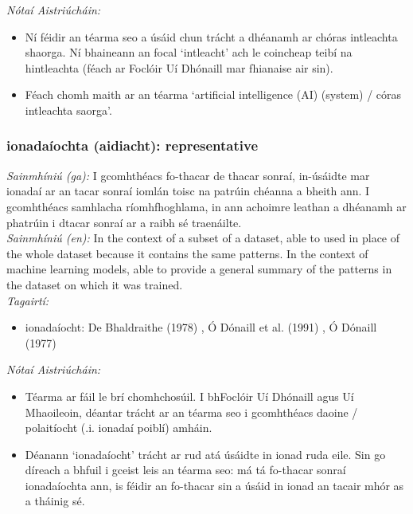  \noindent \textit{Nótaí Aistriúcháin:}
\begin{itemize}
	\item Ní féidir an téarma seo a úsáid chun trácht a dhéanamh ar chóras intleachta shaorga. Ní bhaineann an focal `intleacht' ach le coincheap teibí na hintleachta (féach ar Foclóir Uí Dhónaill mar fhianaise air sin).
	\item Féach chomh maith ar an téarma `artificial intelligence (AI) (system) / córas intleachta saorga'.
\end{itemize}


\subsubsection*{ionadaíochta (aidiacht): representative}
 \noindent \textit{Sainmhíniú (ga):} I gcomhthéacs fo-thacar de thacar sonraí, in-úsáidte mar ionadaí ar an tacar sonraí iomlán toisc na patrúin chéanna a bheith ann. I gcomhthéacs samhlacha ríomhfhoghlama, in ann achoimre leathan a dhéanamh ar phatrúin i dtacar sonraí ar a raibh sé traenáilte.
\\
 \noindent \textit{Sainmhíniú (en):} In the context of a subset of a dataset, able to used in place of the whole dataset because it contains the same patterns. In the context of machine learning models, able to provide a general summary of the patterns in the dataset on which it was trained.
\\
 \noindent \textit{Tagairtí:}
\begin{itemize}
	\item ionadaíocht: De Bhaldraithe (1978) \cite{de-bhaldraithe}, Ó Dónaill et al. (1991) \cite{focloir-beag}, Ó Dónaill (1977) \cite{odonaill}
\end{itemize}

 \noindent \textit{Nótaí Aistriúcháin:}
\begin{itemize}
	\item Téarma ar fáil le brí chomhchosúil. I bhFoclóir Uí Dhónaill agus Uí Mhaoileoin, déantar trácht ar an téarma seo i gcomhthéacs daoine / polaitíocht (.i. ionadaí poiblí) amháin.
	\item Déanann `ionadaíocht' trácht ar rud atá úsáidte in ionad ruda eile. Sin go díreach a bhfuil i gceist leis an téarma seo: má tá fo-thacar sonraí ionadaíochta ann, is féidir an fo-thacar sin a úsáid in ionad an tacair mhór as a tháinig sé.
\end{itemize}


